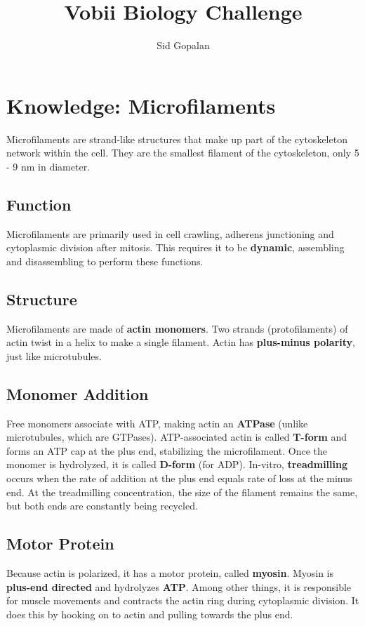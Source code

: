 \documentclass[11pt]{article}
\begin{document}
\title{Vobii Biology Challenge}
\author{Sid Gopalan}
\maketitle



\section*{Knowledge: Microfilaments}
	Microfilaments are strand-like structures that make up part of the cytoskeleton network within the cell. They are the smallest filament of the cytoskeleton, only 5 - 9 nm in diameter.  
	
	\subsection*{Function}
	Microfilaments are primarily used in cell crawling, adherens junctioning and cytoplasmic division after mitosis. This requires it to be \textbf{dynamic}, assembling and disassembling to perform these functions.
	\subsection*{Structure}
	Microfilaments are made of \textbf{actin monomers}. Two strands (protofilaments) of actin twist in a helix to make a single  filament. Actin has \textbf{plus-minus polarity}, just like microtubules.
	\subsection*{Monomer Addition}
	Free monomers associate with ATP, making actin an \textbf{ATPase} (unlike microtubules, which are GTPases). ATP-associated actin is called  \textbf{T-form} and forms an ATP cap at the plus end, stabilizing the microfilament. Once the monomer is hydrolyzed, it is called \textbf{D-form} (for ADP). In-vitro, \textbf{treadmilling} occurs when the rate of addition at the plus end equals rate of loss at the minus end. At the treadmilling concentration, the size of the filament remains the same, but both ends are constantly being recycled. 
	\subsection*{Motor Protein}
	Because actin is polarized, it has a motor protein, called \textbf{myosin}. Myosin is \textbf{plus-end directed} and hydrolyzes \textbf{ATP}. Among other things, it is responsible for muscle movements and contracts the actin ring during cytoplasmic division. It does this by hooking on to actin and pulling towards the plus end.
\end{document}
